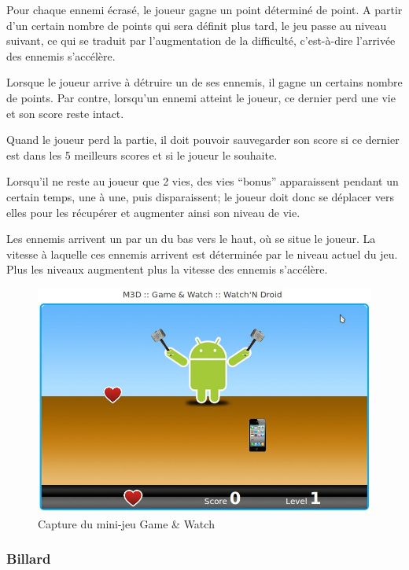 Pour chaque ennemi écrasé, le joueur gagne un point déterminé de point. A partir d’un certain nombre de points qui sera définit plus tard, 
le jeu passe au niveau suivant, ce qui se traduit par l’augmentation de la difficulté, c’est-à-dire l’arrivée des ennemis s’accélère.

Lorsque le joueur arrive à détruire un de ses ennemis, il gagne un certains nombre de points. Par contre, lorsqu’un ennemi atteint le joueur, 
ce dernier perd une vie et son score reste intact.

Quand le joueur perd la partie, il doit pouvoir sauvegarder son score si ce dernier est dans les 5 meilleurs scores et si le joueur le souhaite.

Lorsqu’il ne reste au joueur que 2 vies, des vies “bonus” apparaissent pendant un certain temps, une à une, puis disparaissent; 
le joueur doit donc se déplacer vers elles pour les récupérer et augmenter ainsi son niveau de vie.

Les ennemis arrivent un par un du bas vers le haut, où se situe le joueur. 
La vitesse à laquelle ces ennemis arrivent est déterminée par le niveau actuel du jeu. 
Plus les niveaux augmentent plus la vitesse des ennemis s’accélère.

\begin{figure}
 \includegraphics[width=\linewidth]{img/capturejeu_watchndroid}
 \caption{Capture du mini-jeu Game \& Watch}
 \label{fig:game_gamewatch}
\end{figure}

\subsubsection{Billard}

